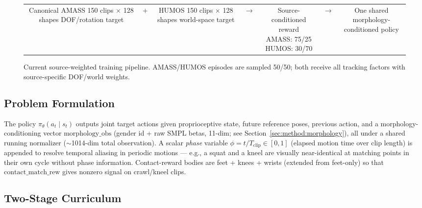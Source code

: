 \begin{figure}[t]
  \centering
  \small
  \begin{tabular}{c@{\;}c@{\;}c@{\;}c@{\;}c@{\;}c@{\;}c}
    \fbox{\parbox{0.17\linewidth}{\centering Canonical AMASS\\150 clips $\times$ 128 shapes\\DOF/rotation target}}
    & $+$ &
    \fbox{\parbox{0.17\linewidth}{\centering HUMOS\\150 clips $\times$ 128 shapes\\world-space target}}
    & $\longrightarrow$ &
    \fbox{\parbox{0.22\linewidth}{\centering Source-conditioned reward\\AMASS: 75/25\\HUMOS: 30/70}}
    & $\longrightarrow$ &
    \fbox{\parbox{0.15\linewidth}{\centering One shared\\morphology-conditioned policy}}
  \end{tabular}
  \caption{Current source-weighted training pipeline. AMASS/HUMOS episodes are sampled 50/50;
  both receive all tracking factors with source-specific DOF/world weights.}
  \label{fig:source-weighted-pipeline}
\end{figure}

\subsection{Problem Formulation}
\label{sec:method:problem}

The policy $\pi_\theta(a_t \mid s_t)$ outputs joint target actions given proprioceptive state,
future reference poses, previous action, and a morphology-conditioning vector
$\mathrm{morphology\_obs}$ (gender id + raw SMPL betas, 11-dim; see
Section~\ref{sec:method:morphology}), all under a shared running normalizer ($\sim$1014-dim total
observation). A scalar \emph{phase} variable $\phi = t / T_{\text{clip}} \in [0,1]$ (elapsed motion
time over clip length) is appended to resolve temporal aliasing in periodic motions — e.g., a
squat and a kneel are visually near-identical at matching points in their own cycle without phase
information. Contact-reward bodies are feet + knees + wrists (extended from feet-only) so that
$\mathrm{contact\_match\_rew}$ gives nonzero signal on crawl/kneel clips.

\subsection{Two-Stage Curriculum}
\label{sec:method:curriculum}

